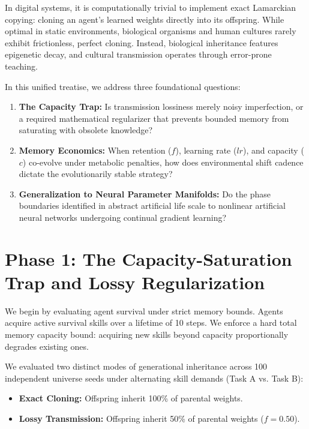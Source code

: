 \documentclass[11pt,a4paper]{article}
\begin{document}
In digital systems, it is computationally trivial to implement exact Lamarckian copying: cloning an agent's learned weights directly into its offspring. While optimal in static environments, biological organisms and human cultures rarely exhibit frictionless, perfect cloning. Instead, biological inheritance features epigenetic decay, and cultural transmission operates through error-prone teaching.

In this unified treatise, we address three foundational questions:
\begin{enumerate}
    \item \textbf{The Capacity Trap:} Is transmission lossiness merely noisy imperfection, or a required mathematical regularizer that prevents bounded memory from saturating with obsolete knowledge?
    \item \textbf{Memory Economics:} When retention ($f$), learning rate ($lr$), and capacity ($c$) co-evolve under metabolic penalties, how does environmental shift cadence dictate the evolutionarily stable strategy?
    \item \textbf{Generalization to Neural Parameter Manifolds:} Do the phase boundaries identified in abstract artificial life scale to nonlinear artificial neural networks undergoing continual gradient learning?
\end{enumerate}

\section{Phase 1: The Capacity-Saturation Trap and Lossy Regularization}
We begin by evaluating agent survival under strict memory bounds. Agents acquire active survival skills over a lifetime of 10 steps. We enforce a hard total memory capacity bound: acquiring new skills beyond capacity proportionally degrades existing ones.

We evaluated two distinct modes of generational inheritance across 100 independent universe seeds under alternating skill demands (Task A vs. Task B):
\begin{itemize}
    \item \textbf{Exact Cloning:} Offspring inherit 100\% of parental weights.
    \item \textbf{Lossy Transmission:} Offspring inherit 50\% of parental weights ($f = 0.50$).
\end{itemize}
\end{document}
